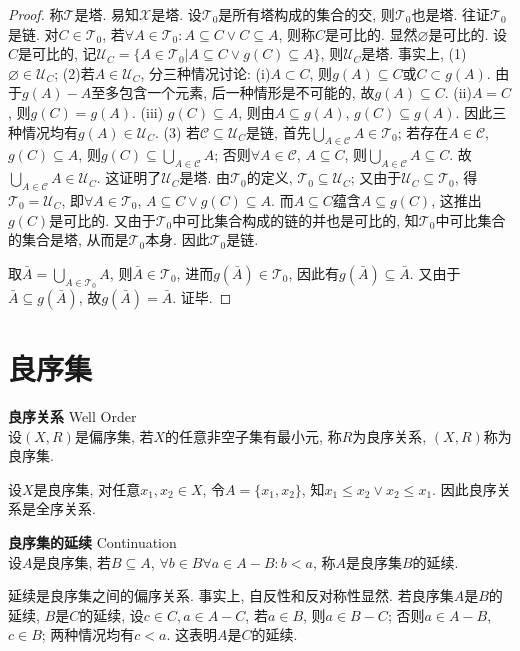 \begin{proof}
称$\mathcal{T}$是塔. 易知$\mathcal{X}$是塔. 设$\mathcal{T}_0$是所有塔构成的集合的交, 则$\mathcal{T}_0$也是塔. 往证$\mathcal{T}_0$是链. 对$C\in \mathcal{T}_0$, 若$\forall A\in \mathcal{T}_0: A\subseteq C \lor C\subseteq A$, 则称$C$是可比的. 显然$\varnothing$是可比的. 设$C$是可比的, 记$\mathcal{U}_C=\{A\in \mathcal{T}_0\vert A\subseteq C \lor g(C)\subseteq A\}$, 则$\mathcal{U}_C$是塔. 事实上, (1) $\varnothing\in \mathcal{U}_C$; (2)若$A\in \mathcal{U}_C$, 分三种情况讨论: (i)$A\subset C$, 则$g(A)\subseteq C$或$C\subset g(A)$. 由于$g(A)-A$至多包含一个元素, 后一种情形是不可能的, 故$g(A)\subseteq C$. (ii)$A=C$, 则$g(C)=g(A)$. (iii) $g(C)\subseteq A$, 则由$A\subseteq g(A)$, $g(C)\subseteq g(A)$. 因此三种情况均有$g(A)\in \mathcal{U}_C$. (3) 若$\mathcal{C} \subseteq \mathcal{U}_C$是链, 首先$\bigcup_{A\in \mathcal{C}} A \in \mathcal{T}_0$; 若存在$A\in \mathcal{C}$, $g(C)\subseteq A$, 则$g(C)\subseteq \bigcup_{A\in \mathcal{C}} A$; 否则$\forall A\in \mathcal{C}$, $A\subseteq C$, 则$\bigcup_{A\in \mathcal{C}} A\subseteq C$. 故$\bigcup_{A\in \mathcal{C}} A \in \mathcal{U}_C$. 这证明了$\mathcal{U}_C$是塔. 由$\mathcal{T}_0$的定义, $\mathcal{T}_0\subseteq \mathcal{U}_C$; 又由于$\mathcal{U}_C\subseteq\mathcal{T}_0$, 得$\mathcal{T}_0=\mathcal{U}_C$, 即$\forall A\in \mathcal{T}_0$, $A\subseteq C \lor g(C)\subseteq A$. 而$A\subseteq C$蕴含$A\subseteq g(C)$, 这推出$g(C)$是可比的. 又由于$\mathcal{T}_0$中可比集合构成的链的并也是可比的, 知$\mathcal{T}_0$中可比集合的集合是塔, 从而是$\mathcal{T}_0$本身. 因此$\mathcal{T}_0$是链.
\par 取$\bar{A}=\bigcup_{A\in \mathcal{T}_0} A$, 则$\bar{A}\in \mathcal{T}_0$, 进而$g(\bar{A})\in \mathcal{T}_0$, 因此有$g(\bar{A})\subseteq \bar{A}$. 又由于$\bar{A}\subseteq g(\bar{A})$, 故$g(\bar{A})=\bar{A}$. 证毕. 
\end{proof}



\section{良序集}

\begin{dfn} \textbf{良序关系} Well Order\\
设$(X,R)$是偏序集, 若$X$的任意非空子集有最小元, 称$R$为良序关系, $(X,R)$称为良序集. 
\end{dfn}
\par 设$X$是良序集, 对任意$x_1,x_2\in X$, 令$A=\{x_1,x_2\}$, 知$x_1\le x_2 \lor x_2\le x_1$. 因此良序关系是全序关系. 

\begin{dfn} \textbf{良序集的延续} Continuation\\
设$A$是良序集, 若$B\subseteq A$, $\forall b\in B\forall a\in A-B: b<a$, 称$A$是良序集$B$的延续. 
\end{dfn}
\par 延续是良序集之间的偏序关系. 事实上, 自反性和反对称性显然. 若良序集$A$是$B$的延续, $B$是$C$的延续, 设$c\in C, a\in A-C$, 若$a\in B$, 则$a\in B-C$; 否则$a\in A-B$, $c\in B$; 两种情况均有$c<a$. 这表明$A$是$C$的延续.

